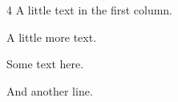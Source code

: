 \documentclass{article}
\begin{document}
\begin{multicols}{4}
A little text in the first column.

A little more text.

Some text here.

And another line.
\end{multicols}
\end{document}

